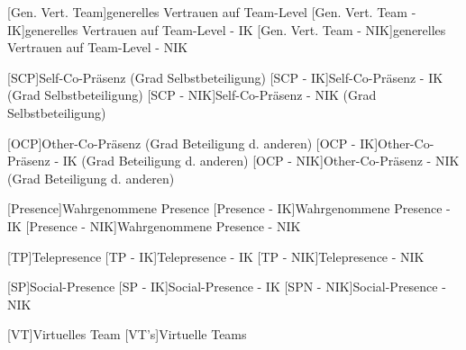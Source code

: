 \begin{acronym}
	[Gen. Vert. Team]{generelles Vertrauen auf Team-Level}
	[Gen. Vert. Team - IK]{generelles Vertrauen auf Team-Level - IK}
	[Gen. Vert. Team - NIK]{generelles Vertrauen auf Team-Level - NIK}
	
	[SCP]{Self-Co-Präsenz (Grad Selbstbeteiligung)}
	[SCP - IK]{Self-Co-Präsenz - IK (Grad Selbstbeteiligung)}
	[SCP - NIK]{Self-Co-Präsenz - NIK (Grad Selbstbeteiligung)}	
	
	[OCP]{Other-Co-Präsenz (Grad Beteiligung d. anderen)}
	[OCP - IK]{Other-Co-Präsenz - IK (Grad Beteiligung d. anderen)}
	[OCP - NIK]{Other-Co-Präsenz - NIK (Grad Beteiligung d. anderen)}	
	
	[Presence]{Wahrgenommene Presence}
	[Presence - IK]{Wahrgenommene Presence - IK}
	[Presence - NIK]{Wahrgenommene Presence - NIK}
	
	[TP]{Telepresence}
	[TP - IK]{Telepresence - IK}
	[TP - NIK]{Telepresence - NIK}	
	
	[SP]{Social-Presence}
	[SP - IK]{Social-Presence - IK}
	[SPN - NIK]{Social-Presence - NIK}
	
	[VT]{Virtuelles Team}
	[VT's]{Virtuelle Teams}
\end{acronym}
